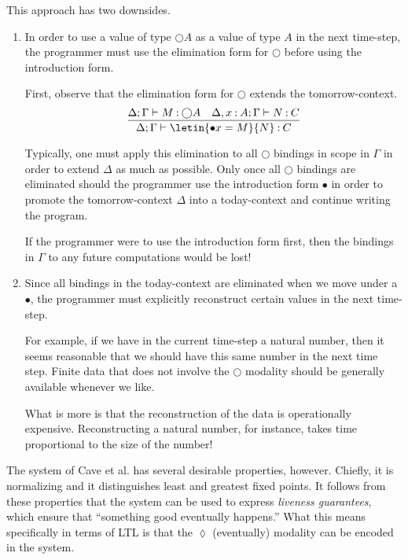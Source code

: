 \documentclass[11pt]{article}
\renewcommand{\circle}{\bigcirc}
\newcommand{\eventually}{\lozenge}
\begin{document}
This approach has two downsides.
%
\begin{enumerate}
  \item
    In order to use a value of type $\circle A$ as a value of type $A$ in the
    next time-step, the programmer must use the elimination form for $\circle$
    before using the introduction form.

    First, observe that the elimination form for $\circle$ extends the
    tomorrow-context.
    \begin{equation*}
      \infer{
        \Delta;\Gamma \proves \letin{\bullet x = M}{N} \hastype C
      }{
        \Delta;\Gamma \proves M \hastype \circle A
        &
        \Delta, x\hastype A; \Gamma \proves N \hastype C
      }
    \end{equation*}

    Typically, one must apply this elimination to all $\circle$ bindings in
    scope in $\Gamma$ in order to extend $\Delta$ as much as possible.
    Only once all $\circle$ bindings are eliminated should the programmer use
    the introduction form $\bullet$ in order to promote the tomorrow-context
    $\Delta$ into a today-context and continue writing the program.

    If the programmer were to use the introduction form first, then the
    bindings in $\Gamma$ to any future computations would be lost!

  \item
    Since all bindings in the today-context are eliminated when we move under a
    $\bullet$, the programmer must explicitly reconstruct certain values in the
    next time-step.

    For example, if we have in the current time-step a natural number, then it
    seems reasonable that we should have this same number in the next time
    step. Finite data that does not involve the $\circle$ modality should be
    generally available whenever we like.

    What is more is that the reconstruction of the data is operationally
    expensive. Reconstructing a natural number, for instance, takes time
    proportional to the size of the number!
\end{enumerate}

The system of Cave et al. has several desirable properties, however.
Chiefly, it is normalizing and it distinguishes least and greatest fixed
points.
It follows from these properties that the system can be used to express
\emph{liveness guarantees}, which ensure that ``something good eventually
happens.'' What this means specifically in terms of LTL is that the
$\eventually$ (eventually) modality can be encoded in the system.
\end{document}

